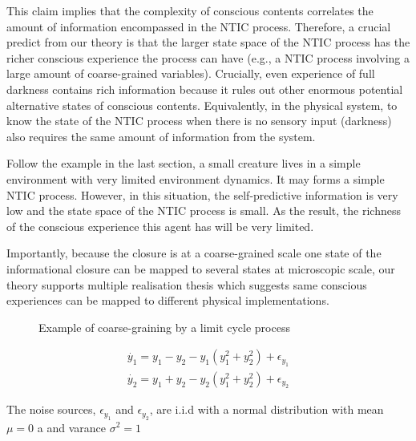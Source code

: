 \documentclass[utf8]{article}
\newcommand{\includegraphicsTodo}[2][]{%
            \tcbox[enhanced,
                center,
            	adjusted title=\large To Be Modified ...,
            	halign title=center,
            	attach boxed title to top left={yshift=-3mm, xshift=1cm,yshifttext=-1mm}, boxed title style={drop fuzzy shadow},
            	colbacktitle=RedOrange!70!black,
            	coltitle=white,
            	colframe=RedOrange!50!black,
            	colback=white
        	]{\texttt{[image: \#2]}}}
\newcommand{\needref}[1]{%
			\ifthenelse{\equal{#1}{}}{%
				\todo[color=White, linecolor=Orange, bordercolor=Orange]{\textcolor{Orange}{Ref}}}{%
				\todo[color=White, linecolor=Orange, bordercolor=Orange]{\textcolor{Orange}{Ref: #1}}%
			}%
		}
\begin{document}
        This claim implies that the complexity of conscious contents correlates the amount of information encompassed in the NTIC process. Therefore, a crucial predict from our theory is that the larger state space of the NTIC process has the richer  conscious experience the process can have (e.g., a NTIC process involving a large amount of coarse-grained variables). Crucially, even experience of full darkness contains rich information because it rules out other enormous potential alternative states of conscious contents. Equivalently, in the physical system, to know the state of the NTIC process when there is no sensory input (darkness) also requires the same amount of information from the system. 
        
        Follow the example in the last section, a small creature lives in a simple environment with very limited environment dynamics. It may forms a simple NTIC process. However, in this situation, the self-predictive information is very low and the state space of the NTIC process is small. As the result, the richness of the conscious experience this agent has will be very limited. 
        
        Importantly, because the closure is at a coarse-grained scale one state of the informational closure can be mapped to several states at microscopic scale, our theory supports multiple realisation thesis \needref{multiple realisation} which suggests same conscious experiences can be mapped to different physical implementations. 
        
		\begin{figure}[H]
			\includegraphicsTodo[width=0.8\textwidth]{WritingMaterials/LimitCycle/PhaseCycle.pdf}
			\label{fig:limitCycle}
			\caption{Example of coarse-graining by a limit cycle process}
		\end{figure}
		

		\begin{equation}\label{eq:LimitCycleExample}
            \begin{array}{l}{\dot{y_1}=y_1-y_2-y_1\left(y_1^{2}+y_2^{2} \right)+\epsilon_{y_1}} \\ {\dot{y_2}=y_1+y_2-y_2\left(y_1^{2}+y_2^{2}\right)+\epsilon_{y_2}}\end{array}
		\end{equation}    		
		
		The noise sources, $\epsilon_{y_1}$ and $\epsilon_{y_2}$, are i.i.d with a normal distribution with mean $\mu=0$ a and varance $\sigma^{2}=1$     
		
\end{document}
